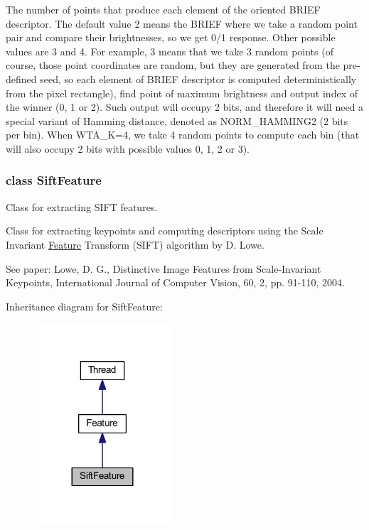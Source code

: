The number of points that produce each element of the oriented B\-R\-I\-E\-F descriptor. The default value 2 means the B\-R\-I\-E\-F where we take a random point pair and compare their brightnesses, so we get 0/1 response. Other possible values are 3 and 4. For example, 3 means that we take 3 random points (of course, those point coordinates are random, but they are generated from the pre-\/defined seed, so each element of B\-R\-I\-E\-F descriptor is computed deterministically from the pixel rectangle), find point of maximum brightness and output index of the winner (0, 1 or 2). Such output will occupy 2 bits, and therefore it will need a special variant of Hamming distance, denoted as N\-O\-R\-M\-\_\-\-H\-A\-M\-M\-I\-N\-G2 (2 bits per bin). When W\-T\-A\-\_\-\-K=4, we take 4 random points to compute each bin (that will also occupy 2 bits with possible values 0, 1, 2 or 3). 

\label{class_sift_feature}
\hypertarget{group___feature_extractor_class_sift_feature}{}
\subsubsection{class Sift\-Feature}
Class for extracting S\-I\-F\-T features. 

Class for extracting keypoints and computing descriptors using the Scale Invariant \hyperlink{group___feature_extractor_class_feature}{Feature} Transform (S\-I\-F\-T) algorithm by D. Lowe.

See paper\-: Lowe, D. G., \-Distinctive Image Features from Scale-\/\-Invariant Keypoints, International Journal of Computer Vision, 60, 2, pp. 91-\/110, 2004. 

Inheritance diagram for Sift\-Feature\-:\nopagebreak
\begin{figure}[H]
\begin{center}
\leavevmode
\includegraphics[width=144pt]{class_sift_feature__inherit__graph}
\end{center}
\end{figure}


